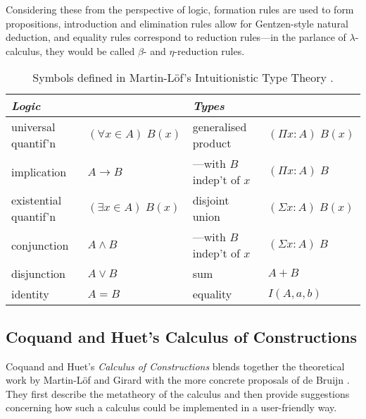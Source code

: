 \documentclass[12pt,toc=bibliography,numbers=noendperiod,
               footnotes=multiple,twoside]{scrartcl}
\begin{document}
Considering these from the perspective of logic, formation rules are used to form propositions, introduction and elimination rules allow for Gentzen-style natural deduction, and equality rules correspond to reduction rules---in the parlance of \(\lambda\)-calculus, they would be called \(\beta\)- and \(\eta\)-reduction rules.

\begin{table}[h]
    \centering
    \begin{tabular}{l l l l}
        \toprule
        \textit{Logic} & & \textit{Types} & \\
        \midrule
	universal quantif'n & \((\forall x \in A)\;B(x)\)
		& generalised product & \((\Pi x : A)\;B(x)\) \\
	implication & \(A \rightarrow B\)
		& ---with \(B\) indep't of \(x\) & \((\Pi x : A)\;B\) \\
	existential quantif'n & \((\exists x \in A)\;B(x)\)
		& disjoint union & \((\Sigma x : A)\;B(x)\) \\
	conjunction & \(A \wedge B\)
		& ---with \(B\) indep't of \(x\) & \((\Sigma x : A)\;B\) \\
	disjunction & \(A \vee B\)
		& sum & \(A + B\) \\
	identity & \(A = B\)
		& equality & \(I(A, a, b)\) \\
	
        \bottomrule
    \end{tabular}
    \caption{Symbols defined in Martin-Löf's Intuitionistic Type Theory \parencite{sambin_intuitionistic_1984}.}
    \label{tab:martin-loef}
\end{table}

\subsection{Coquand and Huet's Calculus of Constructions}

Coquand and Huet's \emph{Calculus of Constructions} blends together the theoretical work by Martin-Löf and Girard with the more concrete proposals of de Bruijn \autocite{coquand_calculus_1988}. They first describe the metatheory of the calculus and then provide suggestions concerning how such a calculus could be implemented in a user-friendly way.
\end{document}
